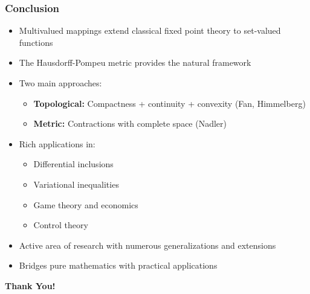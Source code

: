 \documentclass[aspectratio=169,10pt]{beamer}
\begin{document}
\begin{frame}[allowframebreaks]
\frametitle{Conclusion}

\begin{itemize}
    \item Multivalued mappings extend classical fixed point theory to set-valued functions

    \item The Hausdorff-Pompeu metric provides the natural framework

    \item Two main approaches:
    \begin{itemize}
        \item \textbf{Topological:} Compactness + continuity + convexity (Fan, Himmelberg)
        \item \textbf{Metric:} Contractions with complete space (Nadler)
    \end{itemize}

    \item Rich applications in:
    \begin{itemize}
        \item Differential inclusions
        \item Variational inequalities
        \item Game theory and economics
        \item Control theory
    \end{itemize}

    \item Active area of research with numerous generalizations and extensions

    \item Bridges pure mathematics with practical applications
\end{itemize}

\vspace{0.5cm}

\centering
\Large \textbf{Thank You!}

\end{frame}
\end{document}
